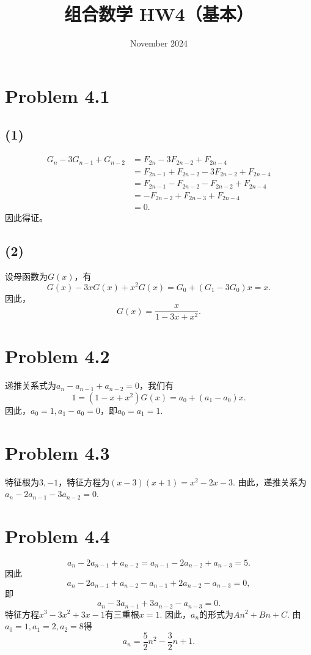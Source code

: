 \documentclass{article}
\title{组合数学 HW4（基本）}
\date{November 2024}
\begin{document}
\maketitle

\section*{Problem 4.1}
\subsection*{(1)}
\begin{align*}
    G_n-3G_{n-1}+G_{n-2}&=F_{2n}-3F_{2n-2}+F_{2n-4}\\
    &=F_{2n-1}+F_{2n-2}-3F_{2n-2}+F_{2n-4}\\
    &=F_{2n-1}-F_{2n-2}-F_{2n-2}+F_{2n-4}\\
    &=-F_{2n-2}+F_{2n-3}+F_{2n-4}\\
    &=0.
\end{align*}
因此得证。

\subsection*{(2)}
设母函数为$G(x)$，有\[G(x)-3xG(x)+x^2G(x)=G_0+(G_1-3G_0)x=x.\] 
因此，\[G(x)=\frac{x}{1-3x+x^2}.\]


\section*{Problem 4.2}
递推关系式为$a_n-a_{n-1}+a_{n-2}=0$，我们有\[1=(1-x+x^2)G(x)=a_0+(a_1-a_0)x.\]
因此，$a_0=1,a_1-a_0=0$，即$a_0=a_1=1$.


\section*{Problem 4.3}
特征根为$3,-1$，特征方程为$(x-3)(x+1)=x^2-2x-3$. 由此，递推关系为$a_n-2a_{n-1}-3a_{n-2}=0$.


\section*{Problem 4.4}
\[a_n-2a_{n-1}+a_{n-2}=a_{n-1}-2a_{n-2}+a_{n-3}=5.\]
因此
\[a_n-2a_{n-1}+a_{n-2}-a_{n-1}+2a_{n-2}-a_{n-3}=0,\]
即\[a_n-3a_{n-1}+3a_{n-2}-a_{n-3}=0.\]
特征方程$x^3-3x^2+3x-1$有三重根$x=1$. 因此，$a_n$的形式为$An^2+Bn+C$. 由$a_0=1,a_1=2,a_2=8$得
\[a_n=\frac{5}{2}n^2-\frac{3}{2}n+1.\]
\end{document}
